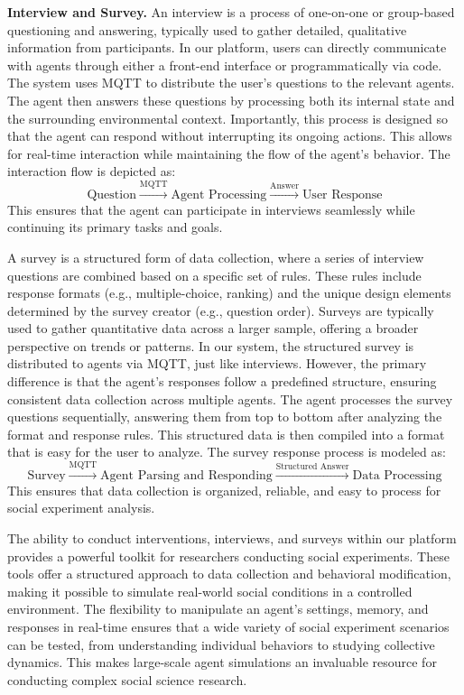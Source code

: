 \textbf{Interview and Survey.} An interview is a process of one-on-one or group-based questioning and answering, typically used to gather detailed, qualitative information from participants. In our platform, users can directly communicate with agents through either a front-end interface or programmatically via code. The system uses MQTT to distribute the user’s questions to the relevant agents. The agent then answers these questions by processing both its internal state and the surrounding environmental context. Importantly, this process is designed so that the agent can respond without interrupting its ongoing actions. This allows for real-time interaction while maintaining the flow of the agent’s behavior. The interaction flow is depicted as:
\[
\text{Question} \xrightarrow{\text{MQTT}} \text{Agent Processing} \xrightarrow{\text{Answer}} \text{User Response}
\]
This ensures that the agent can participate in interviews seamlessly while continuing its primary tasks and goals.

A survey is a structured form of data collection, where a series of interview questions are combined based on a specific set of rules. These rules include response formats (e.g., multiple-choice, ranking) and the unique design elements determined by the survey creator (e.g., question order). Surveys are typically used to gather quantitative data across a larger sample, offering a broader perspective on trends or patterns.
In our system, the structured survey is distributed to agents via MQTT, just like interviews. However, the primary difference is that the agent’s responses follow a predefined structure, ensuring consistent data collection across multiple agents. The agent processes the survey questions sequentially, answering them from top to bottom after analyzing the format and response rules. This structured data is then compiled into a format that is easy for the user to analyze. The survey response process is modeled as:
\[
\text{Survey} \xrightarrow{\text{MQTT}} \text{Agent Parsing and Responding} \xrightarrow{\text{Structured Answer}} \text{Data Processing}
\]
This ensures that data collection is organized, reliable, and easy to process for social experiment analysis.

The ability to conduct interventions, interviews, and surveys within our platform provides a powerful toolkit for researchers conducting social experiments. These tools offer a structured approach to data collection and behavioral modification, making it possible to simulate real-world social conditions in a controlled environment. The flexibility to manipulate an agent’s settings, memory, and responses in real-time ensures that a wide variety of social experiment scenarios can be tested, from understanding individual behaviors to studying collective dynamics. This makes large-scale agent simulations an invaluable resource for conducting complex social science research.



